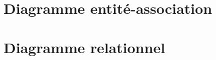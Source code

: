 \documentclass[11pt,a4paper]{article}
\author{Herrier Lucie \and Juckler Christian}
\date{\today}
\begin{document}

\maketitle
\thispagestyle{empty}
\newpage
\mbox{}
\thispagestyle{empty}
\newpage
\setcounter{page}{1}
\tableofcontents
\newpage
\mbox{}
\thispagestyle{empty}
\newpage







\newpage
\mbox{}
\thispagestyle{empty}
\newpage
\appendix
\section{Diagramme entité-association}
\section{Diagramme relationnel}
\end{document}
